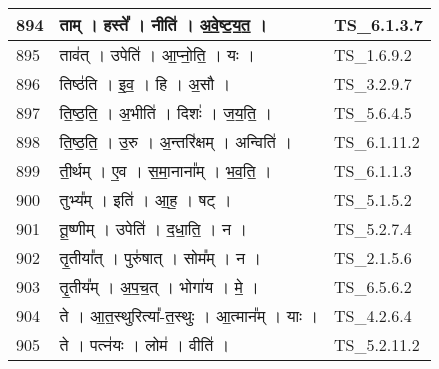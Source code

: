 \documentclass[17pt]{extarticle}
\begin{document}
\begin{longtable}{||p{0.4in}||p{4.9in}||p{0.9in}||}
    894 & ताम्   ।   हस्ते᳚   ।   नीति॑   ।   अ॒वे॒ष्ट॒य॒त॒   ।    & TS\_6.1.3.7       \\
    
    \hline
        
    895 & ताव॑त्   ।   उपेति॑   ।   आ॒प्नो॒ति॒   ।   यः   ।    & TS\_1.6.9.2       \\
    
    \hline
        
    896 & तिष्ठ॑ति   ।   इ॒व॒   ।   हि   ।   अ॒सौ   ।    & TS\_3.2.9.7       \\
    
    \hline
        
    897 & ति॒ष्ठ॒ति॒   ।   अ॒भीति॑   ।   दिशः॑   ।   ज॒य॒ति॒   ।    & TS\_5.6.4.5       \\
    
    \hline
        
    898 & ति॒ष्ठ॒ति॒   ।   उ॒रु   ।   अ॒न्तरि॑क्षम्   ।   अन्विति॑   ।    & TS\_6.1.11.2       \\
    
    \hline
        
    899 & ती॒र्थम्   ।   ए॒व   ।   स॒मा॒नाना᳚म्   ।   भ॒व॒ति॒   ।    & TS\_6.1.1.3       \\
    
    \hline
        
    900 & तुभ्य᳚म्   ।   इति॑   ।   आ॒ह॒   ।   षट्   ।    & TS\_5.1.5.2       \\
    
    \hline
        
    901 & तू॒ष्णीम्   ।   उपेति॑   ।   द॒धा॒ति॒   ।   न   ।    & TS\_5.2.7.4       \\
    
    \hline
        
    902 & तृ॒तीया᳚त्   ।   पुरु॑षात्   ।   सोम᳚म्   ।   न   ।    & TS\_2.1.5.6       \\
    
    \hline
        
    903 & तृ॒तीय᳚म्   ।   अ॒प॒च॒त्   ।   भोगा॑य   ।   मे॒   ।    & TS\_6.5.6.2       \\
    
    \hline
        
    904 & ते   ।   आ॒त॒स्थुरित्या᳚{-}त॒स्थुः   ।   आ॒त्मान᳚म्   ।   याः   ।    & TS\_4.2.6.4       \\
    
    \hline
        
    905 & ते   ।   पत्न॑यः   ।   लोम॑   ।   वीति॑   ।    & TS\_5.2.11.2       \\
    

\end{longtable}
\end{document}
